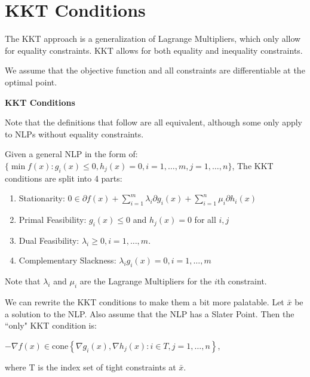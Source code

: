 \documentclass[a4paper]{report}
\begin{document}
\section{KKT Conditions}
The KKT approach is a generalization of Lagrange Multipliers, which only allow for equality constraints. KKT allows for both equality and inequality constraints.
\begin{note}
  We assume that the objective function and all constraints are differentiable at the optimal point.
\end{note}
\begin{definition*}
  \textbf{KKT Conditions} \\
\item Note that the definitions that follow are all equivalent, although some only apply to NLPs without equality constraints.
\item \begin{definition}\label{kkt}
  Given a general NLP in the form of: \\ $\{\min f(x) : g_i(x) \leq 0, h_j(x) = 0, i = 1, \dots, m, j = 1, \dots, n\}$, 
  The KKT conditions are split into 4 parts:
  \begin{enumerate}
    \item Stationarity: $0 \in \partial f(x) + \sum_{i=1}^m \lambda_i \partial g_i(x) + \sum_{i=1}^n \mu_i \partial h_i(x)$
    \item Primal Feasibility: $g_i(x) \leq 0$ and $h_j(x) = 0$ for all $i,j$
    \item Dual Feasibility: $\lambda_i \geq 0, i = 1, \dots, m$.
    \item Complementary Slackness: $\lambda_i g_i(x) = 0, i = 1, \dots, m$
  \end{enumerate}

  Note that $\lambda_i$ and $\mu_i$ are the Lagrange Multipliers for the $i$th constraint.
\end{definition}



\item \begin{definition}\label{kkt2}
We can rewrite the KKT conditions to make them a bit more palatable. Let $\bar x$ be a solution to the NLP. Also assume that the NLP has a Slater Point. Then the ``only" KKT condition is:
\begin{center}
  $-\nabla f(x) \in \text{cone}\left\{ \nabla g_i(x), \nabla h_j(x) : i \in T, j = 1, \dots, n \right\}$,
\end{center}
where T is the index set of tight constraints at $\bar x$.
\end{definition}



\end{definition*}
\end{document}
